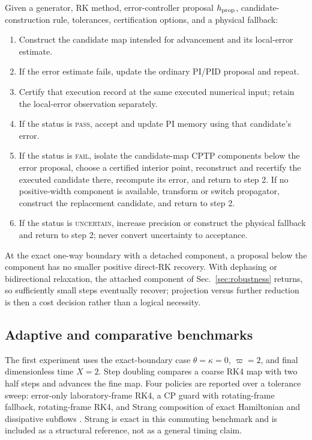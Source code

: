 \begin{algorithm}
\label{alg:candidate_controller}
Given a generator, RK method, error-controller proposal $h_{\rm prop}$, candidate-construction rule, tolerances, certification options, and a physical fallback:
\begin{enumerate}
 \item Construct the candidate map intended for advancement and its local-error estimate.
 \item If the error estimate fails, update the ordinary PI/PID proposal and repeat.
 \item Certify that execution record at the same executed numerical input; retain the local-error observation separately.
 \item If the status is \textsc{pass}, accept and update PI memory using that candidate's error.
 \item If the status is \textsc{fail}, isolate the candidate-map CPTP components below the error proposal, choose a certified interior point, reconstruct and recertify the executed candidate there, recompute its error, and return to step 2. If no positive-width component is available, transform or switch propagator, construct the replacement candidate, and return to step 2.
 \item If the status is \textsc{uncertain}, increase precision or construct the physical fallback and return to step 2; never convert uncertainty to acceptance.
\end{enumerate}
\end{algorithm}

At the exact one-way boundary with a detached component, a proposal below the component has no smaller positive direct-RK recovery. With dephasing or bidirectional relaxation, the attached component of Sec.~\ref{sec:robustness} returns, so sufficiently small steps eventually recover; projection versus further reduction is then a cost decision rather than a logical necessity.

\subsection{Adaptive and comparative benchmarks}

The first experiment uses the exact-boundary case $\theta=\kappa=0$, $\varpi=2$, and final dimensionless time $X=2$. Step doubling compares a coarse RK4 map with two half steps and advances the fine map. Four policies are reported over a tolerance sweep: error-only laboratory-frame RK4, a CP guard with rotating-frame fallback, rotating-frame RK4, and Strang composition of exact Hamiltonian and dissipative subflows \cite{Strang1968}. Strang is exact in this commuting benchmark and is included as a structural reference, not as a general timing claim.

